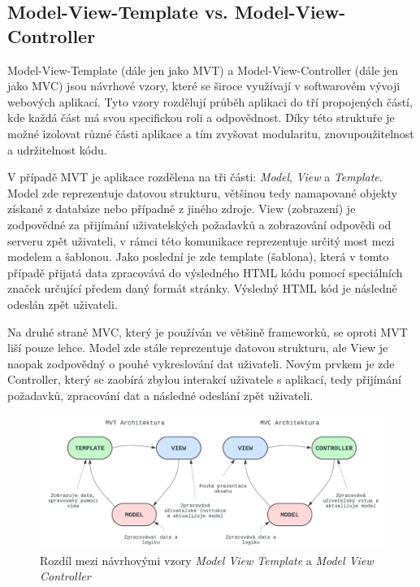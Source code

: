 \subsection*{Model-View-Template vs. Model-View-Controller}
Model-View-Template (dále jen jako MVT) a Model-View-Controller (dále jen jako MVC) jsou návrhové vzory, které se široce využívají v softwarovém vývoji webových aplikací. Tyto vzory rozdělují průběh aplikaci do tří propojených částí, kde každá část má svou specifickou roli a odpovědnost. Díky této struktuře je možné izolovat různé části aplikace a tím zvyšovat modularitu, znovupoužitelnost a udržitelnost kódu.

V případě MVT je aplikace rozdělena na tři části: \textit{Model}, \textit{View} a \textit{Template}. Model zde reprezentuje datovou strukturu, většinou tedy namapované objekty získané z databáze nebo případně z jiného zdroje. View (zobrazení) je zodpovědné za přijímání uživatelských požadavků a zobrazování odpovědi od serveru zpět uživateli, v rámci této komunikace reprezentuje určitý most mezi modelem a šablonou. Jako poslední je zde template (šablona), která v tomto případě přijatá data zpracovává do výsledného HTML kódu pomocí speciálních značek určující předem daný formát stránky. Výsledný HTML kód je následně odeslán zpět uživateli.

Na druhé straně MVC, který je používán ve většině frameworků, se oproti MVT liší pouze lehce. Model zde stále reprezentuje datovou strukturu, ale View je naopak zodpovědný o pouhé vykreslování dat uživateli. Novým prvkem je zde Controller, který se zaobírá zbylou interakcí uživatele s aplikací, tedy přijímání požadavků, zpracování dat a následné odeslání zpět uživateli. \cite{mvc_mvt_difference}

\begin{figure}[H]
    \centering
    \includegraphics[width=1.0\textwidth]{diagrams/MVC_MVT_Architecture}
    \caption{Rozdíl mezi návrhovými vzory \textit{Model View Template} a \textit{Model View Controller} \cite{mvc_mvt_difference_img}}
    \label{fig:mvc_mvt_difference}
\end{figure}

